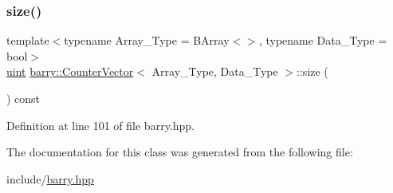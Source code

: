 \mbox{\label{classbarry_1_1_counter_vector_a05508f97e15d5a6dd2fdefb2d03060de}} 
\subsubsection{\texorpdfstring{size()}{size()}}
{\footnotesize\ttfamily template$<$typename Array\+\_\+\+Type = B\+Array$<$$>$, typename Data\+\_\+\+Type = bool$>$ \\
\hyperlink{namespacebarry_a11dfc53ddb4672278319aa04f1e09a6c}{uint} \hyperlink{classbarry_1_1_counter_vector}{barry\+::\+Counter\+Vector}$<$ Array\+\_\+\+Type, Data\+\_\+\+Type $>$\+::size (\begin{DoxyParamCaption}{ }\end{DoxyParamCaption}) const\hspace{0.3cm}{\ttfamily [inline]}}



Definition at line 101 of file barry.\+hpp.



The documentation for this class was generated from the following file\+:\begin{DoxyCompactItemize}
\item 
include/\hyperlink{barry_8hpp}{barry.\+hpp}\end{DoxyCompactItemize}

